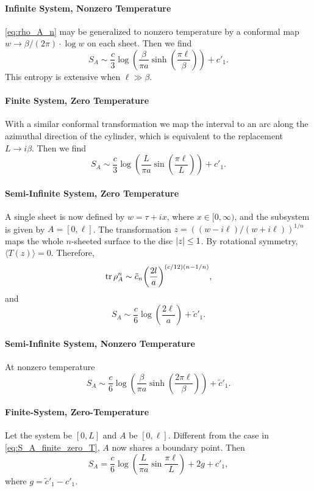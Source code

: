 \documentclass{article}
\begin{document}
\paragraph*{Infinite System, Nonzero Temperature}
\eqref{eq:rho_A_n} may be generalized to nonzero temperature by a conformal map $w \rightarrow \beta/(2\pi) \cdot \log w$ on each sheet.
Then we find
\begin{equation}
    \label{eq:S_A_inf_nonzero_T}
    S_A \sim \frac{c}{3} \log(\frac{\beta}{\pi a} \sinh(\frac{\pi\ell}{\beta})) + c'_1.
\end{equation}
This entropy is extensive when $\ell \gg \beta$.

\paragraph*{Finite System, Zero Temperature}
With a similar conformal transformation we map the interval to an arc along the azimuthal direction of the cylinder, which is equivalent to the replacement $L\rightarrow i\beta$.
Then we find
\begin{equation}
    \label{eq:S_A_finite_zero_T}
    S_A \sim \frac{c}{3} \log(\frac{L}{\pi a} \sin(\frac{\pi\ell}{L})) + c'_1.
\end{equation}

\paragraph*{Semi-Infinite System, Zero Temperature}
A single sheet is now defined by $w = \tau + ix$, where $x \in [0,\infty)$, and the subsystem is given by $A = [0, \ell]$.
The transformation $z = ((w - i\ell)/(w + i\ell))^{1/n}$ maps the whole $n$-sheeted surface to the disc $\abs{z} \le 1$.
By rotational symmetry, $\langle T(z) \rangle = 0$.
Therefore,
\[ \tr \rho^n_A \sim \tilde{c}_n \qty(\frac{2l}{a})^{(c/12)(n - 1/n)}, \]
and
\[ S_A \sim \frac{c}{6} \log(\frac{2\ell}{a}) + \tilde{c}'_1. \]

\paragraph*{Semi-Infinite System, Nonzero Temperature}
At nonzero temperature
\[ S_A \sim \frac{c}{6} \log(\frac{\beta}{\pi a} \sinh(\frac{2\pi \ell}{\beta})) + \tilde{c}'_1. \]

\paragraph*{Finite-System, Zero-Temperature}
Let the system be $[0,L]$ and $A$ be $[0,\ell]$.
Different from the case in \eqref{eq:S_A_finite_zero_T}, $A$ now shares a boundary point.
Then
\[ S_A = \frac{c}{6} \log(\frac{L}{\pi a} \sin \frac{\pi \ell}{L}) + 2g + c'_1, \]
where $g = \tilde{c}'_1 - c'_1$.
\end{document}

